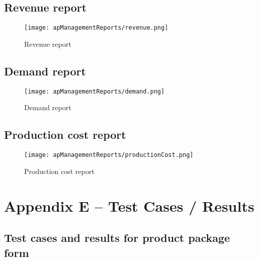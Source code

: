 \documentclass[12pt]{report}
\begin{document}
\section{Revenue report}
\begin{figure}[H]
	\centering
	\texttt{[image: apManagementReports/revenue.png]}
	\caption{Revenue report}
\end{figure}

\section{Demand report}
\begin{figure}[H]
	\centering
	\texttt{[image: apManagementReports/demand.png]}
	\caption{Demand report}
\end{figure}

\section{Production cost report}
\begin{figure}[H]
	\centering
	\texttt{[image: apManagementReports/productionCost.png]}
	\caption{Production cost report}
\end{figure}


\setcounter{chapter}{5}
\setcounter{section}{0}
\setcounter{figure}{0}
\setcounter{table}{0}
\chapter*{\Huge Appendix E – Test Cases / Results}

\section{Test cases and results for product package form}
\end{document}

